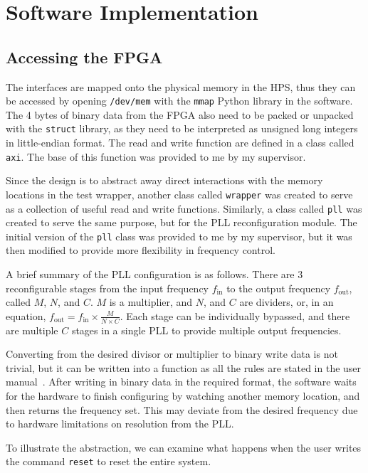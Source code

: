 \chapter{Software Implementation}

\section{Accessing the FPGA}
The interfaces are mapped onto the physical memory in the HPS, thus they can be accessed by opening \texttt{/dev/mem} with the \texttt{mmap} Python library in the software.
The 4 bytes of binary data from the FPGA also need to be packed or unpacked with the \texttt{struct} library, as they need to be interpreted as unsigned long integers in little-endian format.
The read and write function are defined in a class called \texttt{axi}.
The base of this function was provided to me by my supervisor.

Since the design is to abstract away direct interactions with the memory locations in the test wrapper, another class called \texttt{wrapper} was created to serve as a collection of useful read and write functions.
Similarly, a class called \texttt{pll} was created to serve the same purpose, but for the PLL reconfiguration module.
The initial version of the \texttt{pll} class was provided to me by my supervisor, but it was then modified to provide more flexibility in frequency control.

A brief summary of the PLL configuration is as follows.
There are 3 reconfigurable stages from the input frequency $f_\text{in}$ to the output frequency $f_\text{out}$, called $M$, $N$, and $C$.
$M$ is a multiplier, and $N$, and $C$ are dividers, or, in an equation,
$f_\text{out} = f_\text{in} \times \frac{M}{N \times C}$.
Each stage can be individually bypassed, and there are multiple $C$ stages in a single PLL to provide multiple output frequencies.

Converting from the desired divisor or multiplier to binary write data is not trivial, but it can be written into a function as all the rules are stated in the user manual~\cite{Altera7}.
After writing in binary data in the required format, the software waits for the hardware to finish configuring by watching another memory location, and then returns the frequency set.
This may deviate from the desired frequency due to hardware limitations on resolution from the PLL.

To illustrate the abstraction, we can examine what happens when the user writes the command \texttt{reset} to reset the entire system.

